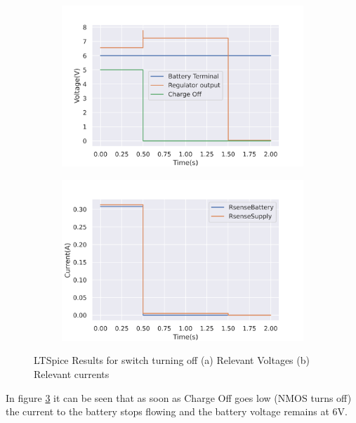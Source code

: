  \begin{figure}[!htb]
 \footnotesize
 \centering
    \begin{subfigure}[]{0.42\textwidth}
              \centering
  		\includegraphics[width=1\linewidth]{./Figures/A2-3.png}
		    \caption{} \label{subfig:A2-3}
     \end{subfigure}
     \begin{subfigure}[]{0.42\textwidth}
             \centering
  		\includegraphics[width=1\linewidth]{./Figures/A2-4.png}
		   \caption{ } \label{subfig:A2-4}
     \end{subfigure}
   \caption[{LTSPICE switch turning off results}]{LTSpice Results for switch turning off  (a)  Relevant Voltages (b)  Relevant currents  }
    \label{fig:two}
 \end{figure}
 \newpage
 In figure \ref{fig:two} it can be seen that as soon as Charge Off goes low (NMOS turns off) the current to the battery stops flowing and the battery voltage remains at 6V.



